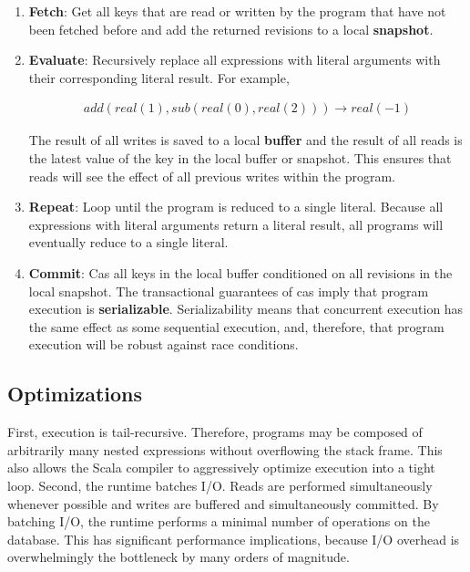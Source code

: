 \documentclass[../main.tex]{subfiles}
\begin{document}
  \begin{enumerate}
    \item \textbf{Fetch}: Get all keys that are read or written by the program that have not been
          fetched before and add the returned revisions to a local \textbf{snapshot}.
    \item \textbf{Evaluate}: Recursively replace all expressions with literal arguments with their
          corresponding literal result. For example,

          \[
          \begin{gathered}
          add(real(1), sub(real(0), real(2))) \rightarrow real(-1)
          \end{gathered}
          \]

          The result of all writes is saved to a local \textbf{buffer} and the result of all reads
          is the latest value of the key in the local buffer or snapshot. This ensures that reads
          will see the effect of all previous writes within the program.
    \item \textbf{Repeat}: Loop until the program is reduced to a single literal. Because all
          expressions with literal arguments return a literal result, all programs will eventually
          reduce to a single literal.
    \item \textbf{Commit}: Cas all keys in the local buffer conditioned on all revisions in
          the local snapshot. The transactional guarantees of cas imply that program execution is
          \textbf{serializable}. Serializability means that concurrent execution has the
          same effect as some sequential execution, and, therefore, that program execution will be
          robust against race conditions.
  \end{enumerate}

  \subsection{Optimizations}
  First, execution is tail-recursive. Therefore, programs may be composed of arbitrarily many
  nested expressions without overflowing the stack frame. This also allows the Scala compiler to
  aggressively optimize execution into a tight loop. Second, the runtime batches I/O. Reads are
  performed simultaneously whenever possible and writes are buffered and simultaneously committed.
  By batching I/O, the runtime performs a minimal number of operations on the database. This has
  significant performance implications, because I/O overhead is overwhelmingly the bottleneck by
  many orders of magnitude.~\cite{io}
\end{document}

